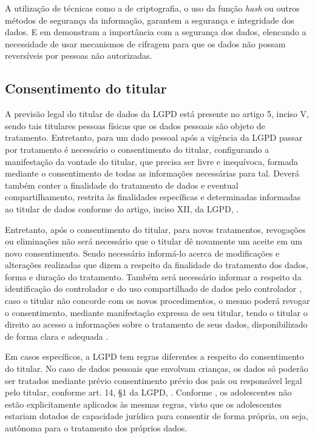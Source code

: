\documentclass[
	12pt,				%
	openright,			%
	oneside,			%
	a4paper,			%
	english,			%
	french,				%
	spanish,			%
	brazil,				%
	]{abntex2}
\begin{document}
A utilização de técnicas como a de criptografia, o uso da função \textit{hash} ou outros métodos de segurança da informação, garantem a segurança e integridade dos dados. E em  demonstram a importância com a segurança dos dados, elencando a necessidade de usar mecanismos de cifragem para que os dados não possam reversíveis por pessoas não autorizadas.

\subsection{Consentimento do titular}
A previsão legal do titular de dados da LGPD está presente no artigo 5, inciso V, sendo tais titulares pessoas físicas que os dados pessoais são objeto de tratamento. Entretanto, para um dado pessoal após a vigência da LGPD passar por tratamento é necessário o consentimento do titular, configurando a manifestação da vontade do titular, que precisa ser livre e inequívoca, formada mediante o consentimento de todas as informações necessárias para tal. Deverá também conter a finalidade do tratamento de dados e eventual compartilhamento, restrita às finalidades específicas e determinadas informadas ao titular de dados conforme do artigo, inciso XII, da LGPD,  \cite{01-01-LeiGeral}.

Entretanto, após o consentimento do titular, para novos tratamentos, revogações ou eliminações não será necessário que o titular dê novamente um aceite em um novo consentimento. Sendo necessário informá-lo acerca de modificações e alterações realizadas que dizem a respeito da finalidade do tratamento dos dados, forma e duração do tratamento. Também será necessário informar a respeito da identificação do controlador e do uso compartilhado de dados pelo controlador \cite{LimaMaldonado2020}, caso o titular não concorde com os novos procedimentos, o mesmo poderá revogar o consentimento, mediante manifestação expressa de seu titular, tendo o titular o direito ao acesso a informações sobre o tratamento de seus dados, disponibilizado de forma clara e adequada \cite{Cots2019}.

Em casos específicos, a LGPD tem regras diferentes a respeito do consentimento do titular. No caso de dados pessoais que envolvam crianças, os dados só poderão ser tratados mediante prévio consentimento prévio dos pais ou responsável legal pelo titular, conforme art. 14, §1 da LGPD, \cite{01-01-LeiGeral}. Conforme , os adolescentes não estão explicitamente aplicados às mesmas regras, visto que os adolescentes estariam dotados de capacidade jurídica para consentir de forma própria, ou seja, autônoma para o tratamento dos próprios dados.
\end{document}
